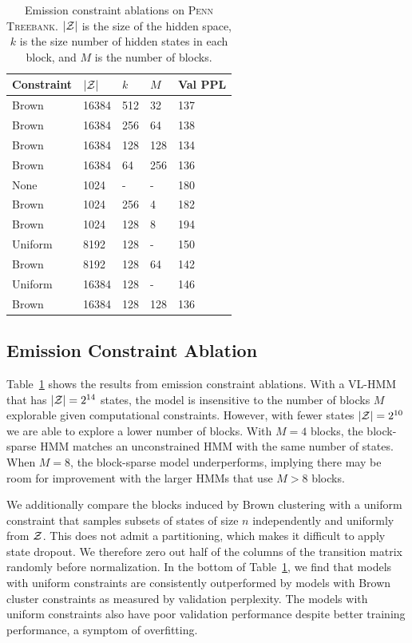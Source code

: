 \documentclass[11pt,a4paper]{article}
\begin{document}
\begin{table}[t]
\centering
\begin{tabular}{lllll}
\toprule
Constraint & $|\mathcal{Z}|$ & $k$ & $M$ & Val PPL\\
\midrule
Brown & 16384 & 512 & 32  & 137\\
Brown & 16384 & 256 & 64  & 138\\
Brown & 16384 & 128 & 128 & 134\\
Brown & 16384 & 64  & 256 & 136\\
\midrule
None  & 1024 & - & - & 180\\
Brown & 1024 & 256 & 4 & 182\\
Brown & 1024 & 128 & 8 & 194\\
\midrule
Uniform    & 8192    & 128    & -   & 150\\
Brown      & 8192    & 128    & 64  & 142\\
Uniform    & 16384   & 128    & -   & 146\\
Brown      & 16384   & 128    & 128 & 136\\
\bottomrule
\end{tabular}
\caption{\label{tbl:constraint-ablation}
Emission constraint ablations on \textsc{Penn Treebank}.
$|\mathcal{Z}|$ is the size of the hidden space,
$k$ is the size number of hidden states in each block,
and $M$ is the number of blocks.
}
\end{table}


\subsection{Emission Constraint Ablation}
Table~\ref{tbl:constraint-ablation} shows the results from 
emission constraint ablations.
With a VL-HMM that has $|\mathcal{Z}|=2^{14}$ states,
the model is insensitive to the number of blocks $M$ explorable given computational constraints.
However, with fewer states $|\mathcal{Z}|=2^{10}$ we are able to explore a lower number of blocks.
With $M=4$ blocks, the block-sparse HMM matches an unconstrained HMM
with the same number of states.
When $M=8$, the block-sparse model underperforms,
implying there may be room for improvement with the larger
HMMs that use $M > 8$ blocks.

We additionally compare the blocks induced by Brown clustering with a uniform
constraint that samples subsets of states of size $n$
independently and uniformly from $\mathcal{Z}$.
This does not admit a partitioning, which makes it difficult to apply state dropout.
We therefore zero out half of the columns of the transition matrix randomly
before normalization.
In the bottom of Table~\ref{tbl:constraint-ablation},
we find that models with uniform constraints
are consistently outperformed by models with Brown cluster constraints
as measured by validation perplexity.
The models with uniform constraints also have poor validation performance
despite better training performance, a symptom of overfitting.
\end{document}

